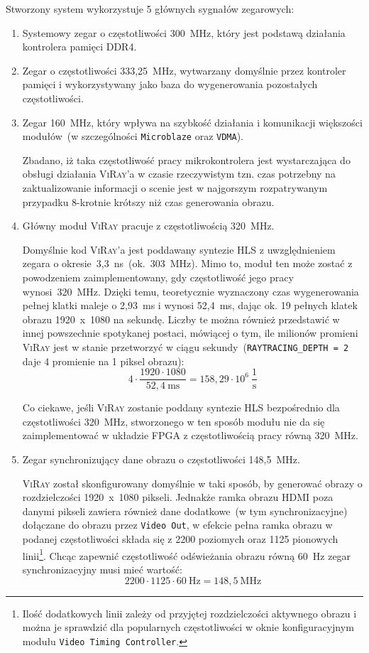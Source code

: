 Stworzony system wykorzystuje 5 głównych sygnałów zegarowych:
\begin{enumerate}
\item Systemowy zegar o częstotliwości 300~MHz, który jest podstawą działania kontrolera pamięci DDR4.
\item Zegar o częstotliwości 333,25~MHz, wytwarzany domyślnie przez kontroler pamięci i wykorzystywany jako baza do wygenerowania pozostałych częstotliwości.
\item Zegar 160~MHz, który wpływa na szybkość działania i komunikacji większości modułów~(w szczególności \texttt{Microblaze} oraz \texttt{VDMA}). 

Zbadano, iż taka częstotliwość pracy mikrokontrolera jest wystarczająca do obsługi działania \textsc{ViRay}'a w czasie rzeczywistym tzn. czas potrzebny na zaktualizowanie informacji o scenie jest w najgorszym rozpatrywanym przypadku 8-krotnie krótszy niż czas generowania obrazu.

\item Główny moduł \textsc{ViRay} pracuje z częstotliwością 320~MHz.

Domyślnie kod \textsc{ViRay}'a jest poddawany syntezie HLS z uwzględnieniem zegara o okresie~3,3~ns~(ok.~303~MHz). Mimo to, moduł ten może zostać z powodzeniem zaimplementowany, gdy częstotliwość jego pracy wynosi~320~MHz. Dzięki temu, teoretycznie wyznaczony czas wygenerowania pełnej klatki maleje o 2,93~ms i wynosi 52,4~ms, dając ok. 19 pełnych klatek obrazu 1920~x~1080 na sekundę. Liczby te można również przedstawić w innej powszechnie spotykanej postaci, mówiącej o tym, ile milionów promieni \textsc{ViRay} jest w stanie przetworzyć w ciągu sekundy~(\texttt{RAYTRACING\_DEPTH = 2} daje 4 promienie na 1 piksel obrazu):
\begin{equation}
4\cdot\frac{1920\cdot 1080}{52,4~\mathrm{ms}}=158,29\cdot 10^6\ \mathrm{\frac{1}{s}}
\end{equation}

Co ciekawe, jeśli \textsc{ViRay} zostanie poddany syntezie HLS bezpośrednio dla częstotliwości 320~MHz, stworzonego w ten sposób modułu nie da się zaimplementować w układzie FPGA z częstotliwością pracy równą 320~MHz.

\item Zegar synchronizujący dane obrazu o częstotliwości 148,5~MHz.

\textsc{ViRay} został skonfigurowany domyślnie w taki sposób, by generować obrazy o rozdzielczości 1920~x~1080 pikseli. Jednakże ramka obrazu HDMI poza danymi pikseli zawiera również dane dodatkowe~(w tym synchronizacyjne) dołączane do obrazu przez \texttt{Video Out}, w efekcie pełna ramka obrazu w podanej częstotliwości składa się z 2200 poziomych oraz 1125 pionowych linii\footnote{Ilość dodatkowych linii zależy od przyjętej rozdzielczości aktywnego obrazu i można je sprawdzić dla popularnych częstotliwości w oknie konfiguracyjnym modułu \texttt{Video Timing Controller}.}. Chcąc zapewnić częstotliwość odświeżania obrazu równą 60~Hz zegar synchronizacyjny musi mieć wartość:
\begin{equation*}
2200\cdot 1125\cdot 60\ \mathrm{Hz} = 148,5\ \mathrm{MHz}
\end{equation*}
\end{enumerate}

